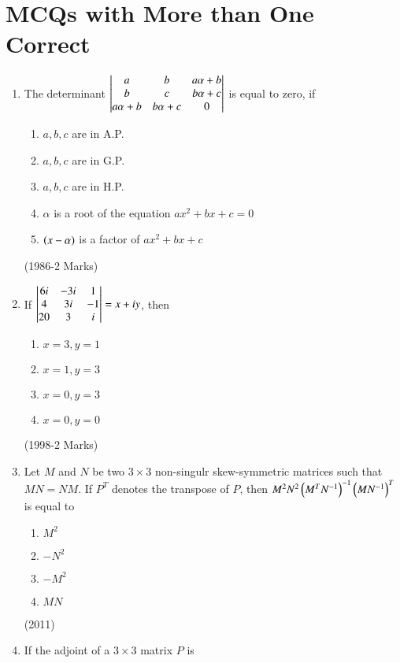 \documentclass[journal,12pt,twocolumn]{IEEEtran}
\theoremstyle{remark}
\begin{document}
		\section{MCQs with More than One Correct}
			\begin{enumerate}
				\item
					The determinant $
							\begin{vmatrix}
								a & b & a \alpha + b\\
								b & c & b \alpha + c\\
								a \alpha + b & b \alpha + c & 0
							\end{vmatrix}
					$ is equal to zero, if
						\begin{enumerate}
									\item $a,b,c$ are in A.P.
									\item $a,b,c$ are in G.P.
									\item $a,b,c$ are in H.P.
									\item $\alpha$ is a root of the equation $ax^2 + bx +c=0$
									\item $\left(x-\alpha\right)$ is a factor of $ax^2 + bx +c$
						\end{enumerate}
						\hfill (1986-2 Marks)\\
				\item 
					If $
					\begin{vmatrix}
						6i & -3i & 1\\
						4 & 3i & -1\\
						20 & 3 & i
					\end{vmatrix} = x +iy$, then 
					\begin{enumerate}
						\item $x=3,y=1$
						\item $x=1,y=3$
						\item $x=0,y=3$
						\item $x=0,y=0$
					\end{enumerate}
					\hfill (1998-2 Marks)\\
				\item 
					Let $M$ and $N$ be two $3 \times 3$ non-singulr skew-symmetric matrices such that $MN=NM$. If $P^T$ denotes the transpose of $P$, then $M^2N^2\left(M^TN^{-1}\right)^{-1} \left(MN^{-1}\right)^T$ is equal to 
					\begin{enumerate}
						\item $M^2$
						\item $-N^2$
						\item $-M^2$
						\item $MN$
					\end{enumerate}
					\hfill (2011)\\
				\item 
					If the adjoint of a $3 \times 3$ matrix $P$ is 

\end{enumerate}
\end{document}
